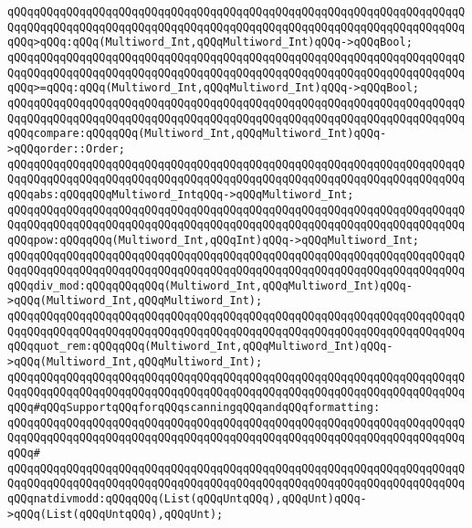 \verb|qQQqqQQqqQQqqQQqqQQqqQQqqQQqqQQqqQQqqQQqqQQqqQQqqQQqqQQqqQQqqQQqqQQqqQQqqQQqqQQqqQQqqQQqqQQqqQQqqQQqqQQqqQQqqQQqqQQqqQQqqQQqqQQqqQQqqQQqqQQqqQQq>qQQq:qQQq(Multiword_Int,qQQqMultiword_Int)qQQq->qQQqBool;|\newline
\verb|qQQqqQQqqQQqqQQqqQQqqQQqqQQqqQQqqQQqqQQqqQQqqQQqqQQqqQQqqQQqqQQqqQQqqQQqqQQqqQQqqQQqqQQqqQQqqQQqqQQqqQQqqQQqqQQqqQQqqQQqqQQqqQQqqQQqqQQqqQQqqQQq>=qQQq:qQQq(Multiword_Int,qQQqMultiword_Int)qQQq->qQQqBool;|\newline
\verb|qQQqqQQqqQQqqQQqqQQqqQQqqQQqqQQqqQQqqQQqqQQqqQQqqQQqqQQqqQQqqQQqqQQqqQQqqQQqqQQqqQQqqQQqqQQqqQQqqQQqqQQqqQQqqQQqqQQqqQQqqQQqqQQqqQQqqQQqqQQqqQQqcompare:qQQqqQQq(Multiword_Int,qQQqMultiword_Int)qQQq->qQQqorder::Order;|\newline
\verb|qQQqqQQqqQQqqQQqqQQqqQQqqQQqqQQqqQQqqQQqqQQqqQQqqQQqqQQqqQQqqQQqqQQqqQQqqQQqqQQqqQQqqQQqqQQqqQQqqQQqqQQqqQQqqQQqqQQqqQQqqQQqqQQqqQQqqQQqqQQqqQQqabs:qQQqqQQqMultiword_IntqQQq->qQQqMultiword_Int;|\newline
\verb|qQQqqQQqqQQqqQQqqQQqqQQqqQQqqQQqqQQqqQQqqQQqqQQqqQQqqQQqqQQqqQQqqQQqqQQqqQQqqQQqqQQqqQQqqQQqqQQqqQQqqQQqqQQqqQQqqQQqqQQqqQQqqQQqqQQqqQQqqQQqqQQqpow:qQQqqQQq(Multiword_Int,qQQqInt)qQQq->qQQqMultiword_Int;|\newline
\newline
\verb|qQQqqQQqqQQqqQQqqQQqqQQqqQQqqQQqqQQqqQQqqQQqqQQqqQQqqQQqqQQqqQQqqQQqqQQqqQQqqQQqqQQqqQQqqQQqqQQqqQQqqQQqqQQqqQQqqQQqqQQqqQQqqQQqqQQqqQQqqQQqqQQqdiv_mod:qQQqqQQqqQQq(Multiword_Int,qQQqMultiword_Int)qQQq->qQQq(Multiword_Int,qQQqMultiword_Int);|\newline
\verb|qQQqqQQqqQQqqQQqqQQqqQQqqQQqqQQqqQQqqQQqqQQqqQQqqQQqqQQqqQQqqQQqqQQqqQQqqQQqqQQqqQQqqQQqqQQqqQQqqQQqqQQqqQQqqQQqqQQqqQQqqQQqqQQqqQQqqQQqqQQqqQQqquot_rem:qQQqqQQq(Multiword_Int,qQQqMultiword_Int)qQQq->qQQq(Multiword_Int,qQQqMultiword_Int);|\newline
\newline
\verb|qQQqqQQqqQQqqQQqqQQqqQQqqQQqqQQqqQQqqQQqqQQqqQQqqQQqqQQqqQQqqQQqqQQqqQQqqQQqqQQqqQQqqQQqqQQqqQQqqQQqqQQqqQQqqQQqqQQqqQQqqQQqqQQqqQQqqQQqqQQqqQQq#qQQqSupportqQQqforqQQqscanningqQQqandqQQqformatting:|\newline
\verb|qQQqqQQqqQQqqQQqqQQqqQQqqQQqqQQqqQQqqQQqqQQqqQQqqQQqqQQqqQQqqQQqqQQqqQQqqQQqqQQqqQQqqQQqqQQqqQQqqQQqqQQqqQQqqQQqqQQqqQQqqQQqqQQqqQQqqQQqqQQqqQQq#|\newline
\verb|qQQqqQQqqQQqqQQqqQQqqQQqqQQqqQQqqQQqqQQqqQQqqQQqqQQqqQQqqQQqqQQqqQQqqQQqqQQqqQQqqQQqqQQqqQQqqQQqqQQqqQQqqQQqqQQqqQQqqQQqqQQqqQQqqQQqqQQqqQQqqQQqnatdivmodd:qQQqqQQq(List(qQQqUntqQQq),qQQqUnt)qQQq->qQQq(List(qQQqUntqQQq),qQQqUnt);|\newline

